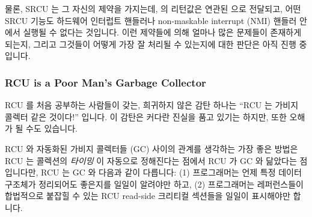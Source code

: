 물론, SRCU 는 그 자신의 제약을 가지는데,  의 리턴값은
연관된  으로 전달되고, 어떤 SRCU 기능도 하드웨어
인터럽트 핸들러나 non-maskable interrupt (NMI) 핸들러 안에서 실행될 수 없다는
것입니다.
이런 제약들에 의해 얼마나 많은 문제들이 존재하게 되는지, 그리고 그것들이 어떻게
가장 잘 처리될 수 있는지에 대한 판단은 아직 진행 중입니다.

\subsubsection{RCU is a Poor Man's Garbage Collector}
\label{sec:defer:RCU is a Poor Man's Garbage Collector}

RCU 를 처음 공부하는 사람들이 갖는, 희귀하지 않은 감탄 하나는 ``RCU 는 가비지
콜렉터 같은 것이다!'' 입니다.
이 감탄은 커다란 진실을 품고 있기는 하지만, 또한 오해가 될 수도 있습니다.

RCU 와 자동화된 가비지 콜렉터들 (GC) 사이의 관계를 생각하는 가장 좋은 방법은
RCU 는 콜렉션의 \emph{타이밍} 이 자동으로 정해진다는 점에서 RCU 가 GC 와
닮았다는 점입니다만, RCU 는 GC 와 다음과 같이 다릅니다: (1) 프로그래머는 언제
특정 데이터 구조체가 정리되어도 좋은지를 일일이 알려야만 하고, (2) 프로그래머는
레퍼런스들이 합법적으로 붙잡힐 수 있는 RCU read-side 크리티컬 섹션들을 일일이
표시해야만 합니다.

